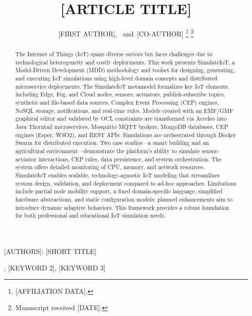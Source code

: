 \documentclass[journal]{IEEEtran}
\begin{document}
\title{[ARTICLE TITLE]}

\author{[FIRST AUTHOR],~
        and~[CO-AUTHOR]%
\thanks{[AFFILIATION DATA].}%
\thanks{Manuscript received [DATE].}}

%
{[AUTHORS]: [SHORT TITLE]}

\maketitle

\begin{abstract}
The Internet of Things (IoT) spans diverse sectors but faces challenges due to technological heterogeneity and costly deployments. This work presents SimulateIoT, a Model-Driven Development (MDD) methodology and toolset for designing, generating, and executing IoT simulations using high-level domain concepts and distributed microservice deployments. The SimulateIoT metamodel formalizes key IoT elements, including Edge, Fog, and Cloud nodes, sensors, actuators, publish-subscribe topics, synthetic and file-based data sources, Complex Event Processing (CEP) engines, NoSQL storage, notifications, and real-time rules. Models created with an EMF/GMF graphical editor and validated by OCL constraints are transformed via Acceleo into Java Thorntail microservices, Mosquitto MQTT brokers, MongoDB databases, CEP engines (Esper, WSO2), and REST APIs. Simulations are orchestrated through Docker Swarm for distributed execution. Two case studies—a smart building and an agricultural environment—demonstrate the platform’s ability to simulate sensor-actuator interactions, CEP rules, data persistence, and system orchestration. The system offers detailed monitoring of CPU, memory, and network resources. SimulateIoT enables scalable, technology-agnostic IoT modeling that streamlines system design, validation, and deployment compared to ad-hoc approaches. Limitations include partial node mobility support, a fixed domain-specific language, simplified hardware abstractions, and static configuration models; planned enhancements aim to introduce dynamic adaptive behaviors. This framework provides a robust foundation for both professional and educational IoT simulation needs.
\end{abstract}

\begin{IEEEkeywords}
[KEYWORD 1], [KEYWORD 2], [KEYWORD 3]
\end{IEEEkeywords}
\end{document}
